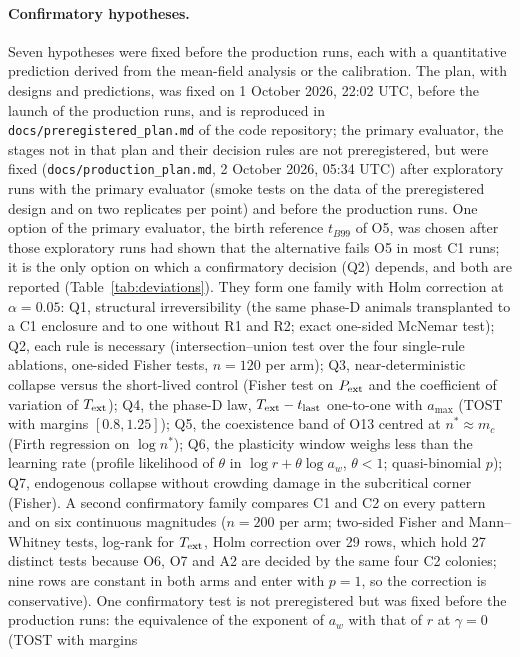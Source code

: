 \paragraph{Confirmatory hypotheses.}
Seven hypotheses were fixed before the production runs, each with a quantitative prediction derived from the
mean-field analysis or the calibration. The plan, with designs and predictions, was fixed on 1 October 2026, 22:02 UTC, before the launch of the production
runs, and is reproduced in \texttt{docs/preregistered\_plan.md} of the code repository; the primary evaluator, the stages not in that plan and
their decision rules are not preregistered, but were fixed (\texttt{docs/production\_plan.md}, 2 October 2026, 05:34 UTC) after exploratory runs
with the primary evaluator (smoke tests on the data of the preregistered design and on two replicates per point) and
before the production runs. One option of the primary evaluator, the birth reference $t_{B99}$ of O5, was chosen after
those exploratory runs had shown that the alternative fails O5 in most \textsf{C1} runs; it is the only option on
which a confirmatory decision (Q2) depends, and both are reported (Table~\ref{tab:deviations}).
They form one family with Holm correction at $\alpha=0.05$: Q1, structural irreversibility (the same phase-D
animals transplanted to a \textsf{C1} enclosure and to one without R1 and R2; exact one-sided McNemar test); Q2, each
rule is necessary (intersection--union test over the four single-rule ablations, one-sided Fisher tests, $n=120$ per
arm); Q3, near-deterministic collapse versus the short-lived control (Fisher test on $P_{\rm ext}$ and the coefficient of
variation of $T_{\rm ext}$); Q4, the phase-D law, $T_{\rm ext}-t_{\rm last}$ one-to-one with $a_{\max}$ (TOST with
margins $[0.8,1.25]$); Q5, the coexistence band of O13 centred at $n^*\approx m_c$ (Firth regression on $\log n^*$);
Q6, the plasticity window weighs less than the learning rate (profile likelihood of $\theta$ in
$\log r+\theta\log a_w$, $\theta<1$; quasi-binomial $p$); Q7, endogenous collapse without crowding damage in the
subcritical corner (Fisher).
A second confirmatory family compares \textsf{C1} and \textsf{C2} on every pattern and on six continuous magnitudes
($n=200$ per arm; two-sided Fisher and Mann--Whitney tests, log-rank for $T_{\rm ext}$, Holm correction over 29 rows,
which hold 27 distinct tests because O6, O7 and A2 are decided by the same four \textsf{C2} colonies; nine rows are constant in both arms
and enter with $p=1$, so the correction is conservative). One confirmatory test is not preregistered but was fixed before the production runs: the equivalence of the exponent of $a_w$ with that of $r$ at $\gamma=0$ (TOST with margins
